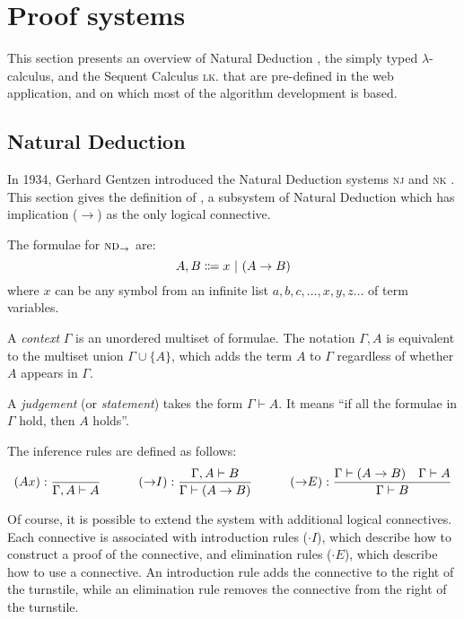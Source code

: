 \section{Proof systems}
\label{background:proof-systems}
This section presents an overview of Natural Deduction \ndt{}, the simply typed $\lambda$-calculus, and the Sequent Calculus \textsc{lk}. that are pre-defined in the web application, and on which most of the algorithm development is based.

\subsection{Natural Deduction \texorpdfstring{\ndt{}}{with implication}}
In 1934, Gerhard Gentzen introduced the Natural Deduction systems \textsc{nj} and \textsc{nk} \cite{gentzen:1969}. This section gives the definition of \ndt{}, a subsystem of Natural Deduction which has implication ($\to$) as the only logical connective.
\begin{definition}
    The formulae for $\textsc{nd}_\to$ are:
    \[
        A, B \Coloneqq x \ |\  (A \to B)
    \]
    where $x$ can be any symbol from an infinite list $a, b, c, \ldots, x, y, z \ldots$ of term variables.
\end{definition}
\begin{definition}
    A \textit{context} $\Gamma$ is an unordered multiset of formulae. The notation $\Gamma, A$ is equivalent to the multiset union $\Gamma \cup \{ A \}$, which adds the term $A$ to $\Gamma$ regardless of whether $A$ appears in $\Gamma$.
\end{definition}
\begin{definition}
    A \textit{judgement} (or \textit{statement}) takes the form $\Gamma \vdash A$. It means ``if all the formulae in $\Gamma$ hold, then $A$ holds''.
\end{definition}
\begin{definition}
    The inference rules are defined as follows:
    {
        \derivationfont
        \[
            (Ax): \frac{}{\Gamma, A \vdash A} \quad\quad\quad (\mathord{\to} I): \frac{\Gamma, A \vdash B}{\Gamma \vdash (A \to B)} \quad\quad\quad (\mathord{\to} E): \frac{\Gamma \vdash (A \to B) \quad \Gamma \vdash A}{\Gamma \vdash B}
        \]
    }%
\end{definition}

Of course, it is possible to extend the system with additional logical connectives. Each connective is associated with introduction rules ($\cdot I$), which describe how to construct a proof of the connective, and elimination rules ($\cdot E$), which describe how to use a connective. An introduction rule adds the connective to the right of the turnstile, while an elimination rule removes the connective from the right of the turnstile.

